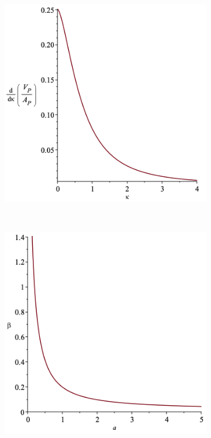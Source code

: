 \begin{figure}
	\centering
	\begin{subfigure}[h!]{.40\textwidth}
		\includegraphics[width=\textwidth]{Figures/kappa_change.png}
		\caption{}
		\label{kappa_change}
	\end{subfigure}
	~
	\begin{subfigure}[h!]{.40\textwidth}
		\includegraphics[width=\textwidth]{Figures/beta_vs_a.png}
		\caption{}
		\label{beta_vs_a}
	\end{subfigure}
	\caption{}
	\label{A_kappa}
\end{figure}
